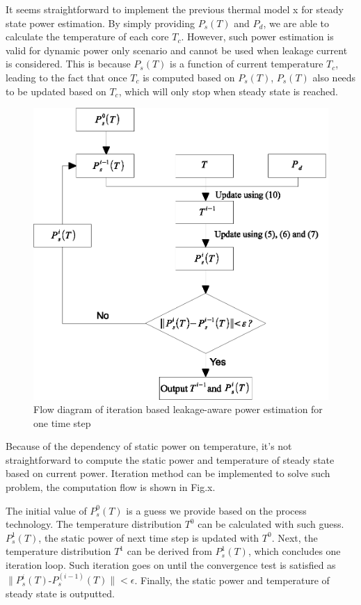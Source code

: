 It seems straightforward to implement the previous thermal model x for steady state power estimation. By simply providing $P_s(T)$ and $P_d$, we are able to calculate the temperature of each core $T_{c}$. However, such power estimation is valid for dynamic power only scenario and cannot be used when leakage current is considered. This is because $P_{s}(T)$ is a function of current temperature $T_{c}$, leading to the fact that once $T_{c}$ is computed based on $P_{s}(T)$, $P_{s}(T)$ also needs to be updated based on $T_{c}$, which will only stop when steady state is reached.
\begin{figure}
\centering
\includegraphics[width=1\linewidth]{fig/iteration_flow.eps}
\caption{Flow diagram of iteration based leakage-aware power estimation for one time step}
\end{figure}

Because of the dependency of static power on temperature, it's not straightforward to compute the static power and temperature of steady state based on current power. Iteration method can be implemented to solve such problem, the computation flow is shown in Fig.x.

The initial value of $P^0_s(T)$ is a guess we provide based on the process technology. The temperature distribution $T^0$ can be calculated with such guess. $P^1_s(T)$, the static power of next time step is updated with $T^0$. Next, the temperature distribution $T^1$ can be derived from $P^1_s(T)$, which concludes one iteration loop. Such iteration goes on until the convergence test is satisfied as $\| P^i_s(T)$-$P^(i-1)_s(T)\|<\epsilon$. Finally, the static power and temperature of steady state is outputted.


